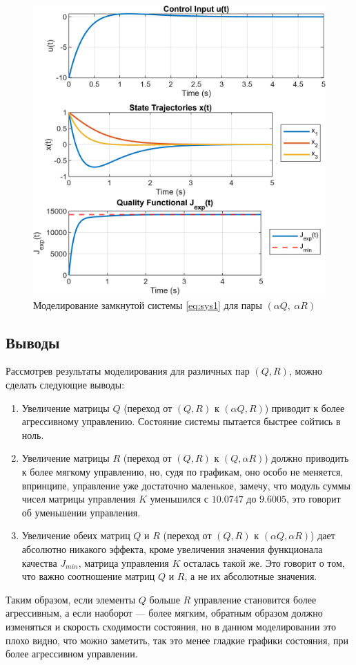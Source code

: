 \begin{figure}[H]
    \centering
    \includegraphics[width=1\linewidth]{figs/1_sim4.png}
    \caption{Моделирование замкнутой системы \eqref{eq:sys1} для пары $(\alpha Q,\ \alpha R)$}
    \label{fig:syssim4}
\end{figure}

\newpage\subsection{Выводы}
Рассмотрев результаты моделирования для различных пар $(Q, R)$, можно сделать 
следующие выводы:
\begin{enumerate}
    \item Увеличение матрицы $Q$ (переход от $(Q, R)$ к $(\alpha Q, R)$) 
    приводит к более агрессивному управлению. Состояние системы пытается
    быстрее сойтись в ноль.
    \item Увеличение матрицы $R$ (переход от $(Q, R)$ к $(Q, \alpha R)$) 
    должно приводить к более мягкому управлению, но, судя по графикам, оно особо не меняется,
    впринципе, управление уже достаточно маленькое, замечу, что
    модуль суммы чисел матрицы управления $K$ уменьшился с $10.0747$ до $9.6005$,
    это говорит об уменьшении управления.
    \item Увеличение обеих матриц $Q$ и $R$ (переход от $(Q, R)$ к $(\alpha Q, \alpha R)$) 
    дает абсолютно никакого эффекта, кроме увеличения значения
    функционала качества $J_{min}$, матрица управления $K$ осталась такой же.
    Это говорит о том, что важно соотношение матриц $Q$ и $R$, а не их
    абсолютные значения.
\end{enumerate}
Таким образом, если элементы $Q$ больше $R$ управление становится более агрессивным, а 
если наоборот — более мягким, обратным образом должно изменяться и скорость сходимости
состояния, но в данном моделировании это плохо видно, что можно заметить, так это
менее гладкие графики состояния, при более агрессивном управлении.





